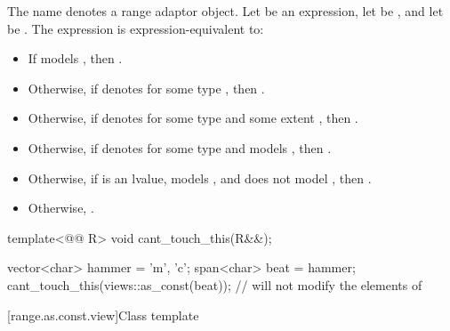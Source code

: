 \pnum
The name  denotes
a range adaptor object.
Let  be an expression,
let  be , and
let  be .
The expression  is expression-equivalent to:
\begin{itemize}
\item
If  models ,
then .
\item
Otherwise,
if  denotes 
for some type , then .
\item
Otherwise,
if  denotes 
for some type  and some extent ,
then .
\item
Otherwise,
if  denotes  for some type  and
 models ,
then .
\item
Otherwise,
if  is an lvalue,
 models , and
 does not model ,
then .
\item
Otherwise, .
\end{itemize}

\pnum
\begin{example}
\begin{codeblock}
template<@@ R>
void cant_touch_this(R&&);

vector<char> hammer = {'m', 'c'};
span<char> beat = hammer;
cant_touch_this(views::as_const(beat));         // will not modify the elements of 
\end{codeblock}
\end{example}

[range.as.const.view]{Class template }

